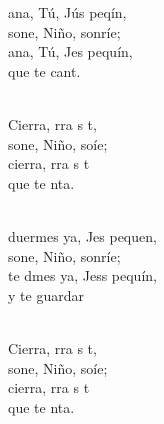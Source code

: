 \documentclass[12pt]{article}
\begin{document}
\begin{multicols*}{2}
\begin{cancion}[Nana][]%
	ana, Tú, Jús peqín, \\
	sone, Niño, sonríe; \\
	ana, Tú, Jes pequín, \\
	que  te cant. \\\jump\\
	\begin{chorus}%
	Cierra, rra s t,\\
	sone, Niño, soíe;\\
	cierra, rra s t\\
	que te nta.\\
	\end{chorus}%
	\jump\\
	duermes ya, Jes pequen,  \\
	sone, Niño, sonríe; \\
	te dmes ya, Jess pequín,\\
	y  te guardar\\\jump\\
	\begin{chorus}%
	Cierra, rra s t,\\
	sone, Niño, soíe;\\
	cierra, rra s t\\
	que te nta.\\
	\end{chorus}%
	\jump\\
\end{cancion}%


\end{multicols*}
\end{document}
